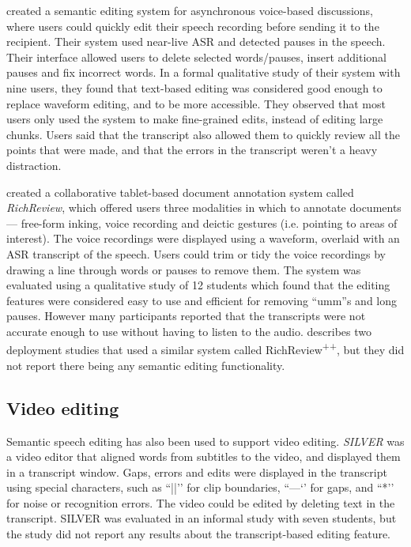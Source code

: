 \citet{Sivaraman2016} created a semantic editing system for asynchronous voice-based discussions, where users could
quickly edit their speech recording before sending it to the recipient.  Their system used near-live ASR
and detected pauses in the speech. Their interface allowed users to delete selected words/pauses, insert
additional pauses and fix incorrect words.  In a formal qualitative study of their system with nine users, they found
that text-based editing was considered good enough to replace waveform editing, and to be more accessible. They
observed that most users only used the system to make fine-grained edits, instead of editing large chunks.  Users said
that the transcript also allowed them to quickly review all the points that were made, and that the errors in the
transcript weren't a heavy distraction.

\citet{Yoon2014} created a collaborative tablet-based document annotation system called \textit{RichReview}, which
offered users three modalities in which to annotate documents --- free-form inking, voice recording and deictic gestures
(i.e. pointing to areas of interest). The voice recordings were displayed using a waveform, overlaid with an ASR
transcript of the speech.  Users could trim or tidy the voice recordings by drawing a line through words or pauses to
remove them.  The system was evaluated using a qualitative study of 12 students which found that the editing features
were considered easy to use and efficient for removing ``umm''s and long pauses.  However many participants reported
that the transcripts were not accurate enough to use without having to listen to the audio.
\citet{Yoon2016} describes two deployment studies that used a similar system called RichReview\textsuperscript{++}, but
they did not report there being any semantic editing functionality.

\subsection{Video editing}
Semantic speech editing has also been used to support video editing.  \textit{SILVER} \citep{Casares2002, Long2003} was
a video editor that aligned words from subtitles to the video, and displayed them in a transcript window.  Gaps, errors
and edits were displayed in the transcript using special characters, such as ``||’’ for clip boundaries, ``—‘’ for
gaps, and ``*’’ for noise or recognition errors.  The video could be edited by deleting text in the transcript.  SILVER
was evaluated in an informal study with seven students, but the study did not report any results about the
transcript-based editing feature.

